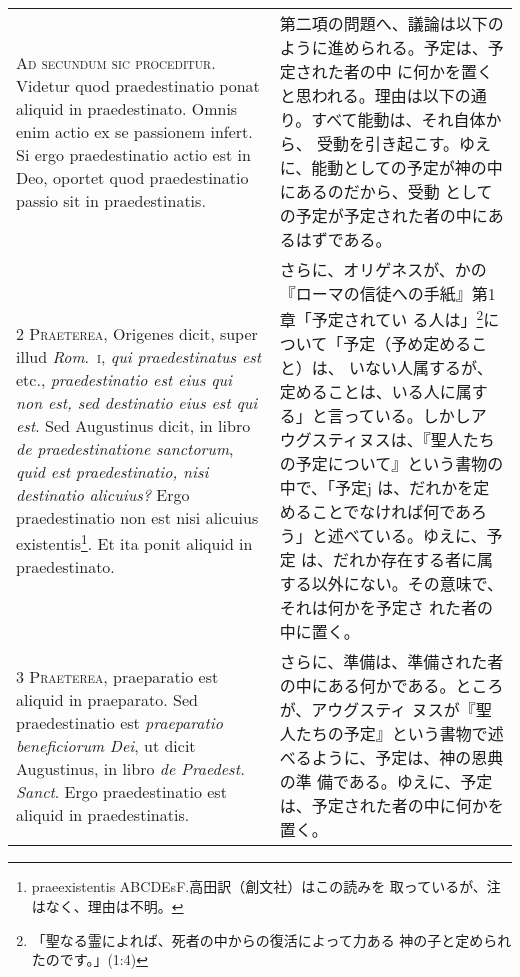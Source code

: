 \documentclass[10pt]{jsarticle} %
\begin{document}
\begin{longtable}{p{21em}p{21em}}


{\Huge A}{\scshape d secundum sic proceditur}. Videtur quod
praedestinatio ponat aliquid in praedestinato. Omnis enim actio ex se
passionem infert. Si ergo praedestinatio actio est in Deo, oportet quod
praedestinatio passio sit in praedestinatis.


&

第二項の問題へ、議論は以下のように進められる。予定は、予定された者の中
に何かを置くと思われる。理由は以下の通り。すべて能動は、それ自体から、
受動を引き起こす。ゆえに、能動としての予定が神の中にあるのだから、受動
としての予定が予定された者の中にあるはずである。

 
\\


{\scshape 2 Praeterea}, Origenes dicit, super illud
{\itshape Rom}.~{\scshape i}, {\itshape qui praedestinatus est} etc., {\itshape praedestinatio est eius qui non
est, sed destinatio eius est qui est}. Sed Augustinus dicit, in libro {\itshape de
praedestinatione sanctorum}, {\itshape quid est praedestinatio, nisi destinatio
alicuius?} Ergo praedestinatio non est nisi alicuius
 existentis\footnote{praeexistentis ABCDEsF.高田訳（創文社）はこの読みを
 取っているが、注はなく、理由は不明。}. Et ita
ponit aliquid in praedestinato.


&

さらに、オリゲネスが、かの『ローマの信徒への手紙』第1章「予定されてい
る人は」\footnote{「聖なる霊によれば、死者の中からの復活によって力ある
神の子と定められたのです。」(1:4)}について「予定（予め定めること）は、
いない人属するが、定めることは、いる人に属する」と言っている。しかしア
ウグスティヌスは、『聖人たちの予定について』という書物の中で、「予定j
は、だれかを定めることでなければ何であろう」と述べている。ゆえに、予定
は、だれか存在する者に属する以外にない。その意味で、それは何かを予定さ
れた者の中に置く。

 
\\


{\scshape 3 Praeterea}, praeparatio est aliquid in
praeparato. Sed praedestinatio est {\itshape praeparatio beneficiorum Dei}, ut
dicit Augustinus, in libro {\itshape  de Praedest. Sanct}. Ergo praedestinatio est
aliquid in praedestinatis.


&

さらに、準備は、準備された者の中にある何かである。ところが、アウグスティ
ヌスが『聖人たちの予定』という書物で述べるように、予定は、神の恩典の準
備である。ゆえに、予定は、予定された者の中に何かを置く。


\end{longtable}
\end{document}
